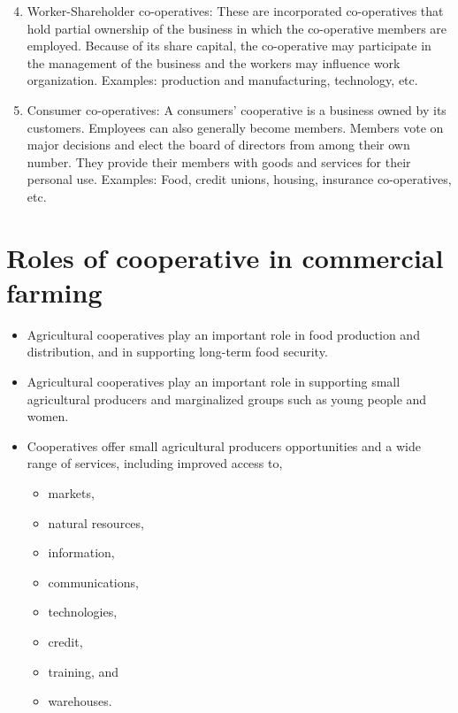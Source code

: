 \documentclass[12pt,ignorenonframetext,aspectratio=169]{beamer}
\providecommand{\tightlist}{%
  \setlength{\itemsep}{0pt}\setlength{\parskip}{0pt}}
\begin{document}
\begin{frame}{}
\protect\hypertarget{section-3}{}
\begin{enumerate}
\setcounter{enumi}{3}
\item
  Worker-Shareholder co-operatives: These are incorporated co-operatives
  that hold partial ownership of the business in which the co-operative
  members are employed. Because of its share capital, the co-operative
  may participate in the management of the business and the workers may
  influence work organization. Examples: production and manufacturing,
  technology, etc.
\item
  Consumer co-operatives: A consumers' cooperative is a business owned
  by its customers. Employees can also generally become members. Members
  vote on major decisions and elect the board of directors from among
  their own number. They provide their members with goods and services
  for their personal use. Examples: Food, credit unions, housing,
  insurance co-operatives, etc.
\end{enumerate}
\end{frame}

\hypertarget{roles-of-cooperative-in-commercial-farming}{%
\section{Roles of cooperative in commercial
farming}\label{roles-of-cooperative-in-commercial-farming}}

\begin{frame}{}
\protect\hypertarget{section-4}{}
\footnotesize

\begin{itemize}
\tightlist
\item
  Agricultural cooperatives play an important role in food production
  and distribution, and in supporting long-term food security.
\item
  Agricultural cooperatives play an important role in supporting small
  agricultural producers and marginalized groups such as young people
  and women.
\item
  Cooperatives offer small agricultural producers opportunities and a
  wide range of services, including improved access to,

  \begin{itemize}
  \tightlist
  \item
    markets,
  \item
    natural resources,
  \item
    information,
  \item
    communications,
  \item
    technologies,
  \item
    credit,
  \item
    training, and
  \item
    warehouses.
  \end{itemize}
\end{itemize}
\end{frame}
\end{document}
